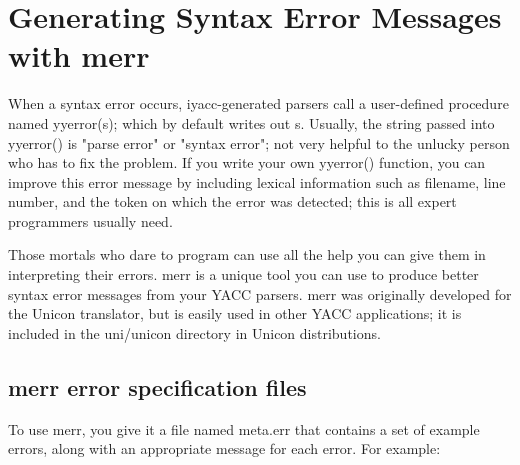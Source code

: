 
\section{Generating Syntax Error Messages with \textsf{merr}}

When a syntax error occurs, iyacc-generated parsers call a
user-defined procedure named \textsf{yyerror(s)}; which by default
writes out \textsf{s}. Usually, the string passed into
\textsf{yyerror()} is "parse error" or
"syntax error"; not very helpful to the
unlucky person who has to fix the problem. If you write your own
\textsf{yyerror()} function, you can improve this error message by
including lexical information such as filename, line number, and the
token on which the error was detected; this is all expert programmers
usually need.

Those mortals who dare to program can use all the help you can give them in
interpreting their errors.  \textsf{merr} is a unique tool you can use to
produce better syntax error messages from your YACC parsers.  \textsf{merr} was originally
developed for the Unicon translator, but is easily used in other YACC
applications; it is included in the uni/unicon directory in Unicon
distributions.

\subsection{\textsf{merr} error specification files}

To use \textsf{merr}, you give it a file named \textsf{meta.err} that contains a
set of example errors, along with an appropriate message for each
error. For example:

